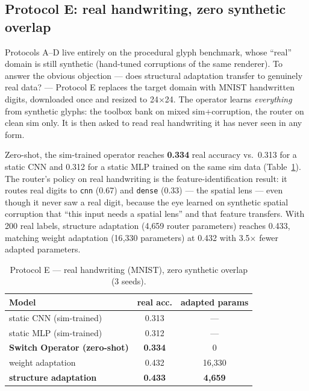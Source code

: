 \documentclass[11pt,a4paper]{article}
\begin{document}
\subsection{Protocol E: real handwriting, zero synthetic overlap}
\label{sec:protocolE}

Protocols A--D live entirely on the procedural glyph benchmark, whose ``real''
domain is still synthetic (hand-tuned corruptions of the same renderer). To
answer the obvious objection --- does structural adaptation transfer to
genuinely real data? --- Protocol E replaces the target domain with MNIST
handwritten digits, downloaded once and resized to 24$\times$24. The operator
learns \emph{everything} from synthetic glyphs: the toolbox bank on mixed
sim+corruption, the router on clean sim only. It is then asked to read real
handwriting it has never seen in any form.

Zero-shot, the sim-trained operator reaches \textbf{0.334} real accuracy vs.\
0.313 for a static CNN and 0.312 for a static MLP trained on the same sim data
(Table~\ref{tab:protE}). The router's policy on real handwriting is the
feature-identification result: it routes real digits to \texttt{cnn} (0.67) and
\texttt{dense} (0.33) --- the spatial lens --- even though it never saw a real
digit, because the eye learned on synthetic spatial corruption that ``this
input needs a spatial lens'' and that feature transfers. With 200 real labels,
structure adaptation (4{,}659 router parameters) reaches 0.433, matching weight
adaptation (16{,}330 parameters) at 0.432 with 3.5$\times$ fewer adapted
parameters.

\begin{table}[t]
  \centering
  \caption{Protocol E --- real handwriting (MNIST), zero synthetic overlap (3 seeds).}
  \label{tab:protE}
  \begin{tabular}{lcc}
    \toprule
    Model & real acc. & adapted params \\
    \midrule
    static CNN (sim-trained) & 0.313 & --- \\
    static MLP (sim-trained) & 0.312 & --- \\
    \textbf{Switch Operator (zero-shot)} & \textbf{0.334} & 0 \\
    weight adaptation & 0.432 & 16{,}330 \\
    \textbf{structure adaptation} & \textbf{0.433} & \textbf{4{,}659} \\
    \bottomrule
  \end{tabular}
\end{table}
\end{document}
